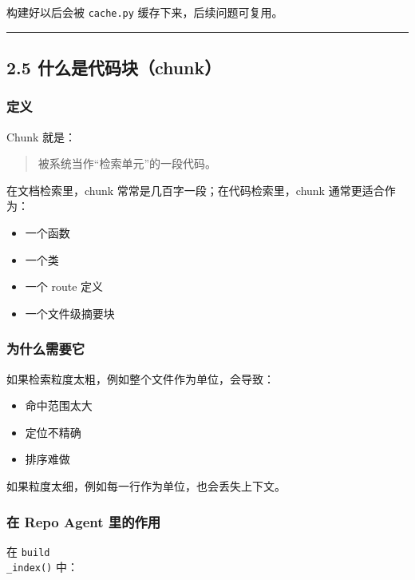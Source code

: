 \documentclass[UTF8,12pt,openany]{ctexbook}
\begin{document}
构建好以后会被 \texttt{cache.py} 缓存下来，后续问题可复用。\par

\hrule

\subsection{2.5 什么是代码块（chunk）}

\subsubsection{定义}

Chunk 就是：\par

\begin{quote}
被系统当作“检索单元”的一段代码。
\end{quote}

在文档检索里，chunk 常常是几百字一段；在代码检索里，chunk 通常更适合作为：\par

\begin{itemize}
\item 一个函数
\item 一个类
\item 一个 route 定义
\item 一个文件级摘要块
\end{itemize}

\subsubsection{为什么需要它}

如果检索粒度太粗，例如整个文件作为单位，会导致：\par

\begin{itemize}
\item 命中范围太大
\item 定位不精确
\item 排序难做
\end{itemize}

如果粒度太细，例如每一行作为单位，也会丢失上下文。\par

\subsubsection{在 Repo Agent 里的作用}

在 \texttt{build\\_index()} 中：\par
\end{document}
